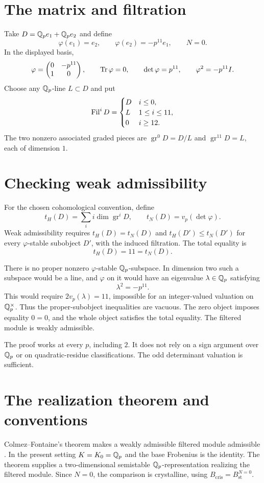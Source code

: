 \section{The matrix and filtration}
Take $D=\mathbb Q_pe_1+\mathbb Q_pe_2$ and define
\[
\varphi(e_1)=e_2,\qquad\varphi(e_2)=-p^{11}e_1,\qquad N=0.
\]
In the displayed basis,
\[
\varphi=\begin{pmatrix}0&-p^{11}\\1&0\end{pmatrix},\qquad
\operatorname{Tr}\varphi=0,\qquad\det\varphi=p^{11},\qquad
\varphi^2=-p^{11}I.
\]
Choose any $\mathbb Q_p$-line $L\subset D$ and put
\[
\operatorname{Fil}^iD=
\begin{cases}
D&i\le0,\\
L&1\le i\le11,\\
0&i\ge12.
\end{cases}
\]
The two nonzero associated graded pieces are $\operatorname{gr}^0D=D/L$ and $\operatorname{gr}^{11}D=L$, each of dimension $1$.

\section{Checking weak admissibility}
For the chosen cohomological convention, define
\[
t_H(D)=\sum_i i\dim\operatorname{gr}^iD,\qquad
t_N(D)=v_p(\det\varphi).
\]
Weak admissibility requires $t_H(D)=t_N(D)$ and $t_H(D')\le t_N(D')$ for every $\varphi$-stable subobject $D'$, with the induced filtration. The total equality is
\[
t_H(D)=11=t_N(D).
\]

There is no proper nonzero $\varphi$-stable $\mathbb Q_p$-subspace. In dimension two such a subspace would be a line, and $\varphi$ on it would have an eigenvalue $\lambda\in\mathbb Q_p$ satisfying
\[
\lambda^2=-p^{11}.
\]
This would require $2v_p(\lambda)=11$, impossible for an integer-valued valuation on $\mathbb Q_p^\times$. Thus the proper-subobject inequalities are vacuous. The zero object imposes equality $0=0$, and the whole object satisfies the total equality. The filtered module is weakly admissible.

The proof works at every $p$, including $2$. It does not rely on a sign argument over $\mathbb Q_p$ or on quadratic-residue classifications. The odd determinant valuation is sufficient.

\section{The realization theorem and conventions}
Colmez--Fontaine's theorem makes a weakly admissible filtered module admissible \cite{CF}. In the present setting $K=K_0=\mathbb Q_p$ and the base Frobenius is the identity. The theorem supplies a two-dimensional semistable $\mathbb Q_p$-representation realizing the filtered module. Since $N=0$, the comparison is crystalline, using $B_{\mathrm{cris}}=B_{\mathrm{st}}^{N=0}$.


